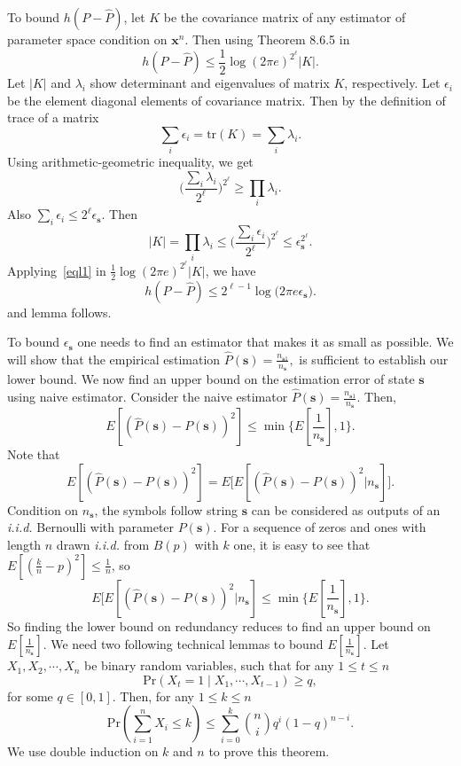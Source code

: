 \documentclass[conference,a4paper]{article}
\newcommand{\x}{\textbf{x}}
\newcommand{\s}{\textbf{s}}
\newcommand{\iid}{\emph{i.i.d.}\xspace}
\newcommand{\hatp}{\hat{P}}
\begin{document}
To bound $h(P-\hatp)$, let $K$ be the covariance matrix of any estimator of parameter space condition on $\x^n$. Then using Theorem 8.6.5 in~\cite{CT}
\[
h(P-\hatp)\leq \frac1{2}\log (2\pi e)^{2^\ell}|K|.
\]
Let $|K|$ and $\lambda_i$ show determinant and eigenvalues of matrix $K$, respectively. Let $\epsilon_i$ be the element diagonal elements of covariance matrix. Then by the definition of trace of a matrix 
\[
\sum_i\epsilon_i= \mathrm{tr}({K})=\sum_i {\lambda_i}.
\]
Using arithmetic-geometric inequality, we get
\begin{equation}
\big(\frac{\sum_i{\lambda_i}}{2^\ell}\big)^{2^\ell}\geq \prod_i {\lambda_i}.
\end{equation}
Also $\sum_i\epsilon_i\leq 2^\ell\epsilon_\s$. Then
\begin{equation}
\label{eql1}
|K|=\prod_i {\lambda_i}\leq \big(\frac{\sum_i\epsilon_i}{2^\ell}\big)^{2^\ell}\leq \epsilon_\s^{2^\ell}.
\end{equation}
Applying~\eqref{eql1} in $\frac1{2}\log (2\pi e)^{2^\ell}|K|$, we have
\[
h(P-\hatp)\leq 2^{\ell-1}\log \big(2\pi e \epsilon_\s\big).
\] 
and lemma follows. 
\eLemma


To bound $\epsilon_\s$ one needs to find an estimator that makes it as small as possible. We will show that the empirical estimation $\hatp(\s)=\frac{n_{\s1}}{n_{\s}},$ is sufficient to establish our lower bound. We now find an upper bound on the estimation error of state $\s$ using naive estimator. 
\bLemma 
\label{lerror}
 Consider the naive estimator $\hatp(\s)=\frac{n_{\s1}}{n_{\s}}$. Then, 
\[
E[(\hatp(\s)-P(\s))^2] \leq \min\{E\left[\frac{1}{n_{\s}}\right],1\}.
\]
\Proof
Note that
\[
E[(\hatp(\s)-P(\s))^2]  = E\big[ E[(\hatp(\s)-P(\s))^2|n_\s]\big].
\]
Condition on $n_\s$, the symbols follow string $\s$ can be considered as outputs of an \iid Bernoulli with parameter $P(\s)$. For a sequence of zeros and ones with length $n$ drawn \iid from $B(p)$ with $k$ one, it is easy to see that $E[(\frac{k}{n}-p)^2]\leq \frac1{n}$, so
\[
E\big[ E[(\hatp(\s)-P(\s))^2|n_\s]\leq 
\min\{E\left[\frac{1}{n_{\s}}\right],1\}.
\]
\eLemma 
So finding the lower bound on redundancy reduces to find an upper bound on $E[\frac1{n_\s}]$. We need two following technical lemmas to bound $E[\frac1{n_\s}]$.
\bLemma
\label{techlemma}
Let $X_1,X_2,\cdots,X_n$ be binary random variables, such that for any $1\le t\le n$
$$\mathrm{Pr}\left(X_t=1\mid X_1,\cdots,X_{t-1}\right)\ge q,$$for some $q\in [0,1]$. Then, for any $1\le k\le n$
$$\mathrm{Pr}\left(\sum_{i=1}^nX_i\le k\right)\le \sum_{i=0}^{k}\binom{n}{i}q^i(1-q)^{n-i}.$$
\Proof
We use double induction on $k$ and $n$ to prove this theorem. 
\end{document}
